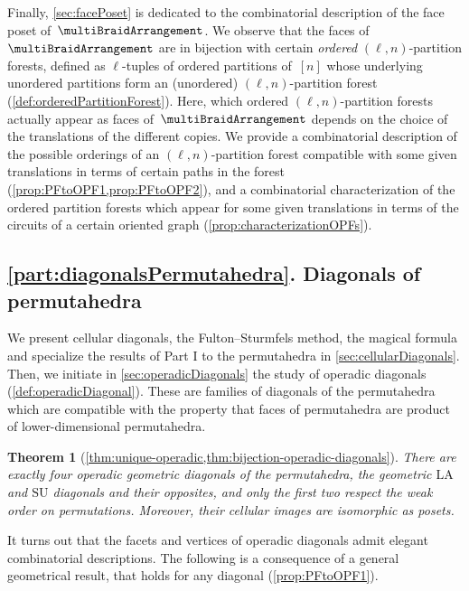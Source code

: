 \documentclass{amsart}
\newtheorem*{theorem*}{Theorem}
\theoremstyle{definition}
\newcommand{\SU}{\mathrm{SU}}
\newcommand{\LA}{\mathrm{LA}}
\begin{document}
Finally, \cref{sec:facePoset} is dedicated to the combinatorial description of the face poset of~$\multiBraidArrangement$.
We observe that the faces of~$\multiBraidArrangement$ are in bijection with certain \emph{ordered} $(\ell,n)$-partition forests, defined as $\ell$-tuples of ordered partitions of~$[n]$ whose underlying unordered partitions form an (unordered) $(\ell,n)$-partition forest (\cref{def:orderedPartitionForest}).
Here, which ordered $(\ell,n)$-partition forests actually appear as faces of~$\multiBraidArrangement$ depends on the choice of the translations of the different copies.
We provide a combinatorial description of the possible orderings of an $(\ell,n)$-partition forest compatible with some given translations in terms of certain paths in the forest (\cref{prop:PFtoOPF1,prop:PFtoOPF2}), and a combinatorial characterization of the ordered partition forests which appear for some given translations in terms of the circuits of a certain oriented graph (\cref{prop:characterizationOPFs}).


\subsection*{\cref{part:diagonalsPermutahedra}. Diagonals of permutahedra}

We present cellular diagonals, the Fulton--Sturmfels method, the magical formula and specialize the results of Part I to the permutahedra in \cref{sec:cellularDiagonals}.
Then, we initiate in \cref{sec:operadicDiagonals} the study of operadic diagonals (\cref{def:operadicDiagonal}).
These are families of diagonals of the permutahedra which are compatible with the property that faces of permutahedra are product of lower-dimensional permutahedra. 

\begin{theorem*}[\cref{thm:unique-operadic,thm:bijection-operadic-diagonals}]
There are exactly four operadic geometric diagonals of the permutahedra, the geometric $\LA$ and $\SU$ diagonals and their opposites, and only the first two respect the weak order on permutations.
Moreover, their cellular images are isomorphic as posets.
\end{theorem*}

It turns out that the facets and vertices of operadic diagonals admit elegant combinatorial descriptions. 
The following is a consequence of a general geometrical result, that holds for any diagonal (\cref{prop:PFtoOPF1}).
\end{document}
